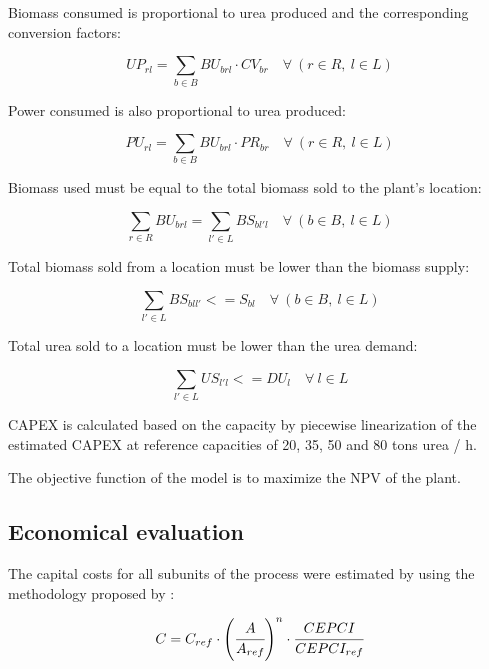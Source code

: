 \documentclass[a4paper, titlepage]{article}
\begin{document}
Biomass consumed is proportional to urea produced and the corresponding conversion factors:

\begin{equation}
	UP_{rl} = \sum_{b \in B} BU_{brl} \cdot CV_{br} \quad \forall \ (r \in R, \ l \in L)
\end{equation}

Power consumed is also proportional to urea produced:

\begin{equation}
	PU_{rl} = \sum_{b \in B} BU_{brl} \cdot PR_{br} \quad \forall \ (r \in R, \ l \in L)
\end{equation}

Biomass used must be equal to the total biomass sold to the plant's location:

\begin{equation}
	\sum_{r \in R} BU_{brl} = \sum_{l' \in L} BS_{bl'l} \quad \forall \ (b \in B, \ l \in L) 
\end{equation}

Total biomass sold from a location must be lower than the biomass supply:

\begin{equation}
	\sum_{l' \in L} BS_{bll'} <= S_{bl} \quad \forall \ (b \in B, \ l \in L)
\end{equation}

Total urea sold to a location must be lower than the urea demand:

\begin{equation}
	\sum_{l' \in L} US_{l'l} <= DU_l \quad \forall \ l \in L 
\end{equation}

CAPEX is calculated based on the capacity by piecewise linearization of the estimated CAPEX at reference capacities of
20, 35, 50 and 80 tons urea / h.

The objective function of the model is to maximize the NPV of the plant.




\subsection{Economical evaluation}
The capital costs for all subunits of the process were estimated by using the methodology proposed by
\textcite{turtonAnalysisSynthesisDesign2018}:

\begin{equation}
	C = C_{ref} \cdot \left( \cfrac{A}{A_{ref}} \right)^n \cdot \cfrac{CEPCI}{CEPCI_{ref}}
\end{equation}
\end{document}
